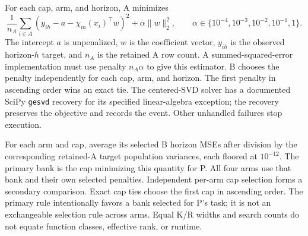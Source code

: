 For each cap, arm, and horizon, A minimizes
\[
 \frac1{n_A}\sum_{i\in A}(y_{ih}-a-\chi_m(x_i)^\top w)^2+\alpha\|w\|_2^2,
 \qquad \alpha\in\{10^{-4},10^{-3},10^{-2},10^{-1},1\}.
\]
The intercept $a$ is unpenalized, $w$ is the coefficient vector, $y_{ih}$ is the observed horizon-$h$ target, and $n_A$ is the retained A row count. A summed-squared-error implementation must use penalty $n_A\alpha$ to give this estimator. B chooses the penalty independently for each cap, arm, and horizon. The first penalty in ascending order wins an exact tie. The centered-SVD solver has a documented SciPy \texttt{gesvd} recovery for its specified linear-algebra exception; the recovery preserves the objective and records the event. Other unhandled failures stop execution.

For each arm and cap, average its selected B horizon MSEs after division by the corresponding retained-A target population variances, each floored at $10^{-12}$. The primary bank is the cap minimizing this quantity for P. All four arms use that bank and their own selected penalties. Independent per-arm cap selection forms a secondary comparison. Exact cap ties choose the first cap in ascending order. The primary rule intentionally favors a bank selected for P's task; it is not an exchangeable selection rule across arms. Equal K/R widths and search counts do not equate function classes, effective rank, or runtime.
